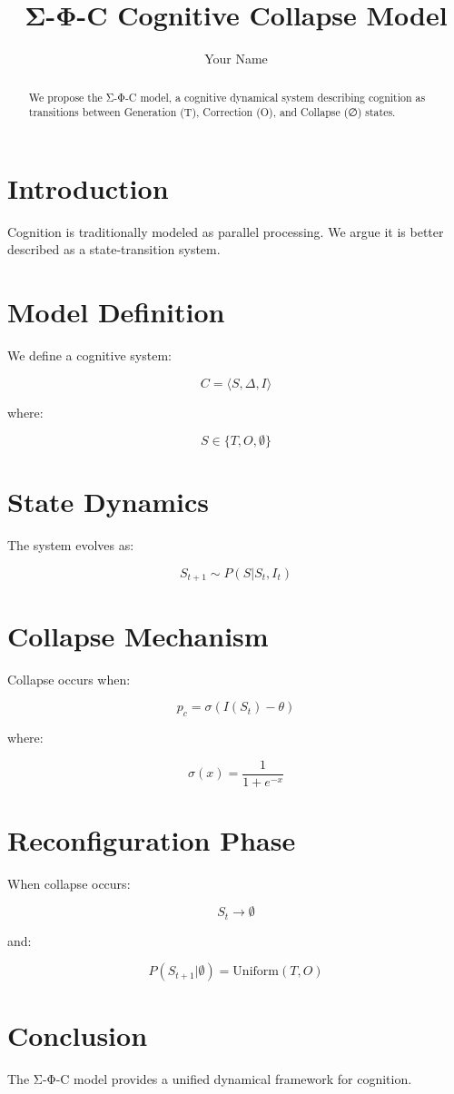 \documentclass{article}
\title{Σ-Φ-C Cognitive Collapse Model}
\author{Your Name}
\date{}
\begin{document}
\maketitle

\begin{abstract}
We propose the Σ-Φ-C model, a cognitive dynamical system describing cognition as transitions between Generation (T), Correction (O), and Collapse (∅) states.
\end{abstract}

\section{Introduction}

Cognition is traditionally modeled as parallel processing. We argue it is better described as a state-transition system.

\section{Model Definition}

We define a cognitive system:

\[
C = \langle S, \Delta, I \rangle
\]

where:

\[
S \in \{T, O, \emptyset\}
\]

\section{State Dynamics}

The system evolves as:

\[
S_{t+1} \sim P(S | S_t, I_t)
\]

\section{Collapse Mechanism}

Collapse occurs when:

\[
p_c = \sigma(I(S_t) - \theta)
\]

where:

\[
\sigma(x) = \frac{1}{1 + e^{-x}}
\]

\section{Reconfiguration Phase}

When collapse occurs:

\[
S_t \rightarrow \emptyset
\]

and:

\[
P(S_{t+1} | \emptyset) = \text{Uniform}(T, O)
\]

\section{Conclusion}

The Σ-Φ-C model provides a unified dynamical framework for cognition.
\end{document}
